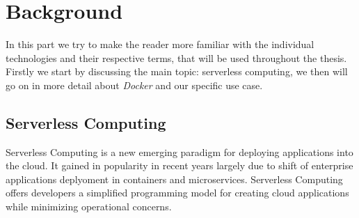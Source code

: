 \section{Background}

In this part we try to make the reader more familiar with the individual technologies and their
respective terms, that will be used throughout the thesis. Firstly we start by discussing the main
topic: serverless computing, we then will go on in more detail about \textit{Docker} and our
specific use case.

\subsection{Serverless Computing}

Serverless Computing is a new emerging paradigm for deploying applications into the cloud. It gained
in popularity in recent years largely due to shift of enterprise applications deplyoment in
containers and microservices. Serverless Computing offers developers a simplified programming model
for creating cloud applications while minimizing operational concerns. \cite{servprog}